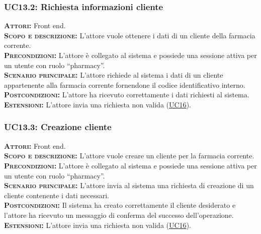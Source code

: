 \subsubsection{UC13.2: Richiesta informazioni cliente}
\label{sec:UC132}
\textsc{\textbf{Attori:}} Front end.\\
\textsc{\textbf{Scopo e descrizione:}} L'attore vuole ottenere i dati di un cliente della farmacia corrente.\\
\textsc{\textsc{\textbf{Precondizioni:}}} L'attore è collegato al sistema e possiede una sessione attiva per un utente con ruolo ``pharmacy''.\\
\textsc{\textbf{Scenario principale:}} L'attore richiede al sistema i dati di un cliente appartenente alla farmacia corrente fornendone il codice identificativo interno.\\
\textsc{\textbf{Postcondizioni:}} L'attore ha ricevuto correttamente i dati richiesti al sistema.\\
\textsc{\textbf{Estensioni:}} L'attore invia una richiesta non valida (\hyperref[sec:UC16]{UC16}).

\subsubsection{UC13.3: Creazione cliente}
\label{sec:UC133}
\textsc{\textbf{Attori:}} Front end.\\
\textsc{\textbf{Scopo e descrizione:}} L'attore vuole creare un cliente per la farmacia corrente.\\
\textsc{\textsc{\textbf{Precondizioni:}}} L'attore è collegato al sistema e possiede una sessione attiva per un utente con ruolo ``pharmacy''.\\
\textsc{\textbf{Scenario principale:}} L'attore invia al sistema una richiesta di creazione di un cliente contenente i dati necessari.\\
\textsc{\textbf{Postcondizioni:}} Il sistema ha creato correttamente il cliente desiderato e l'attore ha ricevuto un messaggio di conferma del successo dell'operazione.\\
\textsc{\textbf{Estensioni:}} L'attore invia una richiesta non valida (\hyperref[sec:UC16]{UC16}).

